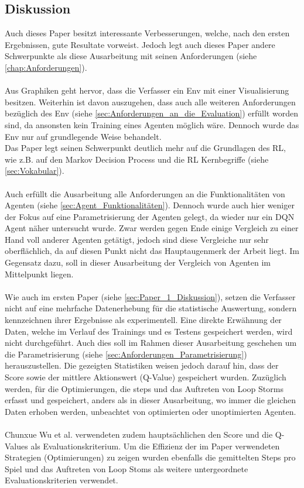 \subsection{Diskussion}\label{sec:Paper_2_Diskussion}
Auch dieses Paper besitzt interessante Verbesserungen, welche, nach den ersten Ergebnissen, gute Resultate vorweist. Jedoch legt auch dieses Paper andere Schwerpunkte als diese Ausarbeitung mit seinen Anforderungen (siehe \ref{chap:Anforderungen}).\\
\\Aus Graphiken geht hervor, dass die Verfasser ein Env mit einer Visualisierung besitzen. Weiterhin ist davon auszugehen, dass auch alle weiteren Anforderungen bezüglich des Env (siehe \ref{sec:Anforderungen_an_die_Evaluation}) erfüllt worden sind, da ansonsten kein Training eines Agenten möglich wäre. Dennoch wurde das Env nur auf grundlegende Weise behandelt.\\
Das Paper legt seinen Schwerpunkt deutlich mehr auf die Grundlagen des RL, wie z.B. auf den Markov Decision Process und die RL Kernbegriffe (siehe \ref{sec:Vokabular}).\\
\\Auch erfüllt die Ausarbeitung alle Anforderungen an die Funktionalitäten von Agenten (siehe \ref{sec:Agent_Funktionalitäten}). Dennoch wurde auch hier weniger der Fokus auf eine Parametrisierung der Agenten gelegt, da wieder nur ein DQN Agent näher untersucht wurde. Zwar werden gegen Ende einige Vergleich zu einer Hand voll anderer Agenten getätigt, jedoch sind diese Vergleiche nur sehr oberflächlich, da auf diesen Punkt nicht das Hauptaugenmerk der Arbeit liegt. 
Im Gegensatz dazu, soll in dieser Ausarbeitung der Vergleich von Agenten im Mittelpunkt liegen.\\
\\Wie auch im ersten Paper (siehe \ref{sec:Paper_1_Diskussion}), setzen die Verfasser nicht auf eine mehrfache Datenerhebung für die statistische Auswertung, sondern kennzeichnen ihrer Ergebnisse als experimentell. 
Eine direkte Erwähnung der Daten, welche im Verlauf des Trainings und es Testens gespeichert werden, wird nicht durchgeführt. Auch dies soll im Rahmen dieser Ausarbeitung geschehen um die Parametrisierung (siehe \ref{sec:Anforderungen_Parametrisierung}) herauszustellen.  
Die gezeigten Statistiken weisen jedoch darauf hin, dass der Score sowie der mittlere Aktionswert (Q-Value) gespeichert wurden. Zuzüglich werden, für die Optimierungen, die steps und das Auftreten von Loop Storms erfasst und gespeichert, anders als in dieser Ausarbeitung, wo immer die gleichen Daten erhoben werden, unbeachtet von optimierten oder unoptimierten Agenten.\\
\\Chunxue Wu et al. verwendeten zudem hauptsächlichen den Score und die Q-Values als Evaluationskriterium. Um die Effizienz der im Paper verwendeten Strategien (Optimierungen) zu zeigen wurden ebenfalls die gemittelten Steps pro Spiel und das Auftreten von Loop Stoms als weitere untergeordnete Evaluationskriterien verwendet.


